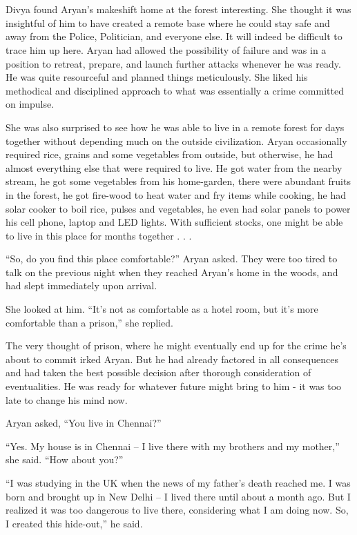 \chapter{}

Divya found Aryan's makeshift home at the forest interesting. She thought it was
insightful of him to have created a remote base where he could stay safe and
away from the Police, Politician, and everyone else. It will indeed be difficult
to trace him up here. Aryan had allowed the possibility of failure and was in a
position to retreat, prepare, and launch further attacks whenever he was ready.
He was quite resourceful and planned things meticulously. She liked his
methodical and disciplined approach to what was essentially a crime committed on
impulse.

She was also surprised to see how he was able to live in a remote forest for
days together without depending much on the outside civilization. Aryan
occasionally required rice, grains and some vegetables from outside, but
otherwise, he had almost everything else that were required to live. He got
water from the nearby stream, he got some vegetables from his home-garden, there
were abundant fruits in the forest, he got fire-wood to heat water and fry items
while cooking, he had solar cooker to boil rice, pulses and vegetables, he even
had solar panels to power his cell phone, laptop and LED lights. With sufficient
stocks, one might be able to live in this place for months together . . .

“So, do you find this place comfortable?” Aryan asked. They were too tired to
talk on the previous night when they reached Aryan's home in the woods, and had
slept immediately upon arrival.

She looked at him. “It's not as comfortable as a hotel room, but it's more
comfortable than a prison,” she replied.

The very thought of prison, where he might eventually end up for the crime he's
about to commit irked Aryan. But he had already factored in all consequences and
had taken the best possible decision after thorough consideration of
eventualities. He was ready for whatever future might bring to him - it was too
late to change his mind now.

Aryan asked, “You live in Chennai?”

“Yes. My house is in Chennai – I live there with my brothers and my mother,” she
said. “How about you?”

“I was studying in the UK when the news of my father's death reached me. I was
born and brought up in New Delhi – I lived there until about a month ago. But I
realized it was too dangerous to live there, considering what I am doing now.
So, I created this hide-out,” he said.

